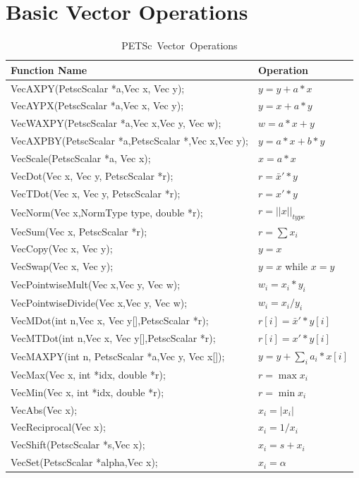 \section{Basic Vector Operations}  
\label{sec_vecbasic}
\begin{table}[tb]
\begin{center}
\begin{tabular}{ll}
{\bf Function Name} & {\bf Operation} \\
\hline
VecAXPY(PetscScalar *a,Vec x, Vec y); & $ y = y + a*x$ \\
VecAYPX(PetscScalar *a,Vec x, Vec y); & $ y = x + a*y$ \\
VecWAXPY(PetscScalar *a,Vec x,Vec y, Vec w); & $ w = a*x + y$ \\
VecAXPBY(PetscScalar *a,PetscScalar *,Vec x,Vec y); & $ y = a*x + b*y$ \\
VecScale(PetscScalar *a, Vec x); & $ x = a*x $ \\
VecDot(Vec x, Vec y, PetscScalar *r); & $ r = \bar{x}'*y$ \\
VecTDot(Vec x, Vec y, PetscScalar *r); & $ r = x'*y$ \\
VecNorm(Vec x,NormType type,  double *r); & $ r = ||x||_{type}$ \\
VecSum(Vec x,   PetscScalar *r); & $ r = \sum x_{i}$ \\
VecCopy(Vec x, Vec y); & $ y = x $ \\
VecSwap(Vec x, Vec y); & $ y = x $ while $ x = y$ \\
VecPointwiseMult(Vec x,Vec y, Vec w); & $ w_{i} = x_{i}*y_{i} $ \\
VecPointwiseDivide(Vec x,Vec y, Vec w); & $ w_{i} = x_{i}/y_{i} $ \\
VecMDot(int n,Vec x, Vec y[],PetscScalar *r); & $ r[i] = \bar{x}'*y[i]$ \\
VecMTDot(int n,Vec x, Vec y[],PetscScalar *r); & $ r[i] = x'*y[i]$ \\
VecMAXPY(int n, PetscScalar *a,Vec y, Vec x[]); \hspace{1cm} & $ y = y + \sum_i a_{i}*x[i] $ \\
VecMax(Vec x,  int *idx, double *r); & $ r = \max x_{i}$ \\
VecMin(Vec x,  int *idx, double *r); & $ r = \min x_{i}$ \\
VecAbs(Vec x); & $ x_i = |x_{i}|$ \\
VecReciprocal(Vec x); & $ x_i = 1/x_{i}$ \\
VecShift(PetscScalar *s,Vec x); & $ x_i = s + x_{i}$ \\
VecSet(PetscScalar *alpha,Vec x); & $ x_i = \alpha$ \\
\hline 
\end{tabular}
\end{center}
\caption{\hbox{PETSc Vector Operations}}
\label{fig_vectorops}
\end{table}


